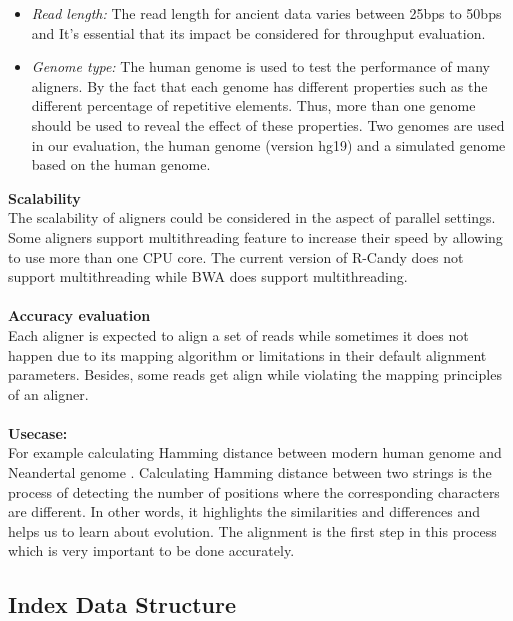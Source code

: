 \documentclass[11pt,a4paper]{report}
\begin{document}
\begin{itemize}

 \item \emph{Read length:}
The read length for ancient data varies between 25bps to 50bps and It's essential that its impact be considered for throughput evaluation.


 \item \emph{Genome type:} 
The human genome is used to test the performance of many aligners.
By the fact that each genome has different properties such as the different percentage of repetitive elements.
Thus, more than one genome should be used to reveal the effect of these properties. Two genomes are used in our evaluation, the human genome (version hg19) and a simulated genome based on the human genome.

\end{itemize}
\textbf{Scalability}
\\
The scalability of aligners could be considered in the aspect of parallel settings.
Some aligners support multithreading feature to increase their speed by allowing to use more than one CPU core.
The current version of R-Candy does not support multithreading while BWA does support multithreading.
 \\\\
\textbf{Accuracy evaluation}
\\
Each aligner is expected to align a set of reads while sometimes it does not happen due to its mapping algorithm or limitations in their default alignment parameters. Besides, some reads get align while violating the mapping principles of an aligner.
\\\\
\textbf{Usecase:}
\\
For example calculating Hamming distance between modern human genome and Neandertal genome .  
Calculating Hamming distance between two strings is the process of detecting the number of positions where the corresponding characters are different. In other words, it highlights the similarities and differences and helps us to learn about evolution. The alignment is the first step in this process which is very important to be done accurately.

\subsection{Index Data Structure}
\end{document}
